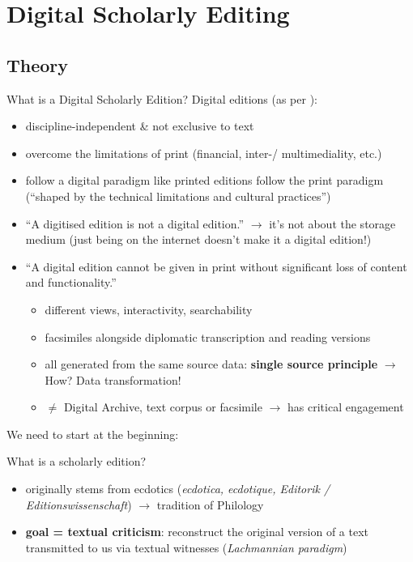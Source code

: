 \section{Digital Scholarly Editing}

\subsection{Theory \parencite{sahleDigitalEdition2016}}
\begin{frame}[allowframebreaks]{What is a Digital Scholarly Edition?}
\small
Digital editions (as per \cite{sahleDigitalEdition2016}):
        \begin{itemize}
            \item discipline-independent \& not exclusive to text
            \item overcome the limitations of print (financial, inter-/ multimediality, etc.)
            \item follow a digital paradigm like printed editions follow the print paradigm (``shaped by the technical limitations and cultural practices'')
            \item ``A digitised edition is not a digital edition.'' $\to$ it's not about the storage medium (just being on the internet doesn't make it a digital edition!)
            \item ``A digital edition cannot be given in print without significant loss of content and functionality.''
            \begin{itemize}\footnotesize
                \item different views, interactivity, searchability
                \item facsimiles alongside diplomatic transcription and reading versions
                \item all generated from the same source data: \textbf{single source principle} $\to$ How? Data transformation!
                \item $\neq$ Digital Archive,  text corpus or facsimile $\to$ has critical engagement 
            \end{itemize}
        \end{itemize}

\framebreak

We need to start at the beginning: 

\begin{block}{What is a scholarly edition?}
\begin{itemize}
    \item originally stems from ecdotics (\emph{ecdotica, ecdotique, Editorik / Editionswissenschaft}) $\to$ tradition of Philology
    \item \textbf{goal = textual criticism}: reconstruct the original version of a text transmitted to us via textual witnesses (\emph{Lachmannian paradigm})
\end{itemize}
\end{block}


\end{frame}
